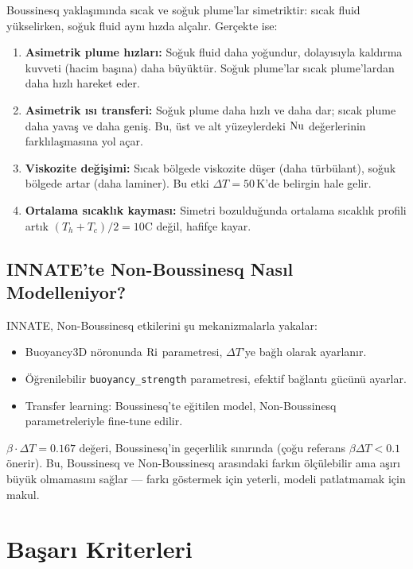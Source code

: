 Boussinesq yaklaşımında sıcak ve soğuk plume'lar simetriktir: sıcak fluid yükselirken, soğuk fluid aynı hızda alçalır. Gerçekte ise:

\begin{enumerate}
    \item \textbf{Asimetrik plume hızları:} Soğuk fluid daha yoğundur, dolayısıyla kaldırma kuvveti (hacim başına) daha büyüktür. Soğuk plume'lar sıcak plume'lardan daha hızlı hareket eder.

    \item \textbf{Asimetrik ısı transferi:} Soğuk plume daha hızlı ve daha dar; sıcak plume daha yavaş ve daha geniş. Bu, üst ve alt yüzeylerdeki $\mathrm{Nu}$ değerlerinin farklılaşmasına yol açar.

    \item \textbf{Viskozite değişimi:} Sıcak bölgede viskozite düşer (daha türbülant), soğuk bölgede artar (daha laminer). Bu etki $\Delta T = 50$\,K'de belirgin hale gelir.

    \item \textbf{Ortalama sıcaklık kayması:} Simetri bozulduğunda ortalama sıcaklık profili artık $(T_h + T_c)/2 = 10$\degree C değil, hafifçe kayar.
\end{enumerate}

\subsection{INNATE'te Non-Boussinesq Nasıl Modelleniyor?}

INNATE, Non-Boussinesq etkilerini şu mekanizmalarla yakalar:
\begin{itemize}
    \item Buoyancy3D nöronunda $\mathrm{Ri}$ parametresi, $\Delta T$'ye bağlı olarak ayarlanır.
    \item Öğrenilebilir \texttt{buoyancy\_strength} parametresi, efektif bağlantı gücünü ayarlar.
    \item Transfer learning: Boussinesq'te eğitilen model, Non-Boussinesq parametreleriyle fine-tune edilir.
\end{itemize}

$\beta \cdot \Delta T = 0.167$ değeri, Boussinesq'in geçerlilik sınırında (çoğu referans $\beta \Delta T < 0.1$ önerir). Bu, Boussinesq ve Non-Boussinesq arasındaki farkın ölçülebilir ama aşırı büyük olmamasını sağlar --- farkı göstermek için yeterli, modeli patlatmamak için makul.


\section{Başarı Kriterleri}
\label{sec:basari}

